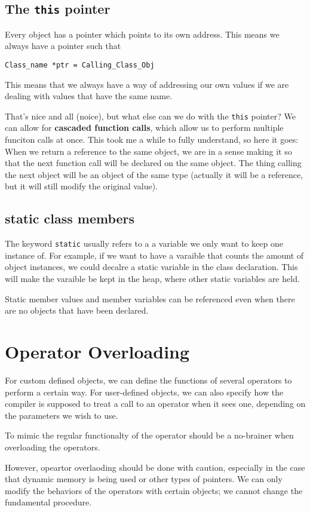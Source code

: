 \documentclass{article}
\begin{document}
\subsection{The \texttt{this} pointer}
Every object has a pointer which points to its own address. This means we always have a pointer such that
\begin{verbatim}
Class_name *ptr = Calling_Class_Obj
\end{verbatim}
This means that we always have a way of addressing our own values if we are dealing with values that have the
same name.

That's nice and all (noice), but what else can we do with the \texttt{this} pointer? We can allow for
\textbf{cascaded function calls}, which allow us to perform multiple funciton calls at once.
This took me a while to fully understand, so here it goes: When we return a reference to the same object, 
we are in a sense making it so that the next function call will be declared on the same object. The thing
calling the next object will be an object of the same type (actually it will be a reference, but it will 
still modify the original value).
\subsection{static class members}
The keyword \texttt{static} usually refers to a a variable we only want to keep one instance of. For example,
if we want to have a varaible that counts the amount of object instances, we could decalre a static variable 
in the class declaration. This will make the varaible be kept in the heap, where other static variables are held.

Static member values and member variables can be referenced even when there are no objects that have
been declared.
\newpage
\section{Operator Overloading}
For custom defined objects, we can define the functions of several operators to perform a certain way. 
For user-defined objects, we can also specify how the compiler is supposed to treat a call to an operator
when it sees one, depending on the parameters we wish to use. 

To mimic the regular functionalty of the operator should be a no-brainer when overloading the operators.

However, opeartor overlaoding should be done with caution, especially in the case that dynamic memory is being 
used or other types of pointers. We can only modify the behaviors of the operators with certain objects;
we cannot change the fundamental procedure.
\end{document}
